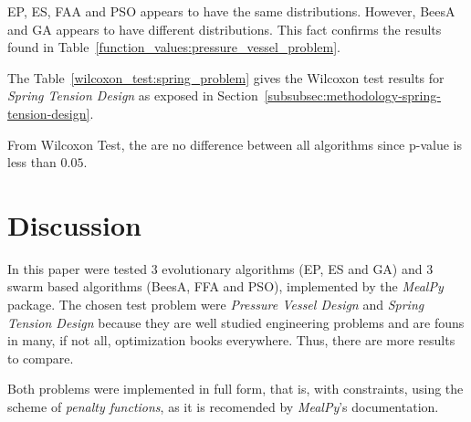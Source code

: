 \documentclass[conference]{IEEEtran}
\begin{document}
EP, ES, FAA and PSO appears to have the same distributions.
However, BeesA and GA appears to have different distributions.
This fact confirms the results found in Table~\ref{function_values:pressure_vessel_problem}.



The Table~\ref{wilcoxon_test:spring_problem} gives the Wilcoxon test results
for \textit{Spring Tension Design} as exposed in Section~\ref{subsubsec:methodology-spring-tension-design}.


\begin{table}[H]
\centering
\caption{Significance Test Using Wilcoxon Test for Spring Tension Design}
\label{wilcoxon_test:spring_problem}
\end{table}

From Wilcoxon Test, the are no difference between all algorithms since p-value
is less than $0.05$.




\section{Discussion}

In this paper were tested 3 evolutionary algorithms (EP, ES and GA) and 3
swarm based algorithms (BeesA, FFA and PSO), implemented by the \textit{MealPy}
package. The chosen test problem were \textit{Pressure Vessel Design} and
\textit{Spring Tension Design} because they are well studied engineering problems
and are founs in many, if not all, optimization books everywhere. Thus, there are
more results to compare.

Both problems were implemented in full form, that is, with constraints, using the scheme of
\textit{penalty functions}, as it is recomended by \textit{MealPy}'s documentation.
\end{document}
